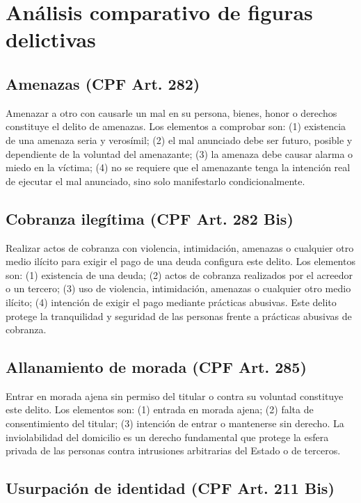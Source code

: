 \documentclass[12pt,spanish,letterpaper,oneside]{article}
\begin{document}
\section{An\'alisis comparativo de figuras delictivas}

\subsection{Amenazas (CPF Art. 282)}

Amenazar a otro con causarle un mal en su persona, bienes, honor o derechos constituye el delito de amenazas. Los elementos a comprobar son: (1) existencia de una amenaza seria y verosímil; (2) el mal anunciado debe ser futuro, posible y dependiente de la voluntad del amenazante; (3) la amenaza debe causar alarma o miedo en la víctima; (4) no se requiere que el amenazante tenga la intención real de ejecutar el mal anunciado, sino solo manifestarlo condicionalmente.

\subsection{Cobranza ileg\'itima (CPF Art. 282 Bis)}

Realizar actos de cobranza con violencia, intimidaci\'on, amenazas o cualquier otro medio il\'icito para exigir el pago de una deuda configura este delito. Los elementos son: (1) existencia de una deuda; (2) actos de cobranza realizados por el acreedor o un tercero; (3) uso de violencia, intimidaci\'on, amenazas o cualquier otro medio il\'icito; (4) intenci\'on de exigir el pago mediante prácticas abusivas. Este delito protege la tranquilidad y seguridad de las personas frente a prácticas abusivas de cobranza.

\subsection{Allanamiento de morada (CPF Art. 285)}

Entrar en morada ajena sin permiso del titular o contra su voluntad constituye este delito. Los elementos son: (1) entrada en morada ajena; (2) falta de consentimiento del titular; (3) intención de entrar o mantenerse sin derecho. La inviolabilidad del domicilio es un derecho fundamental que protege la esfera privada de las personas contra intrusiones arbitrarias del Estado o de terceros.

\subsection{Usurpaci\'on de identidad (CPF Art. 211 Bis)}
\end{document}
